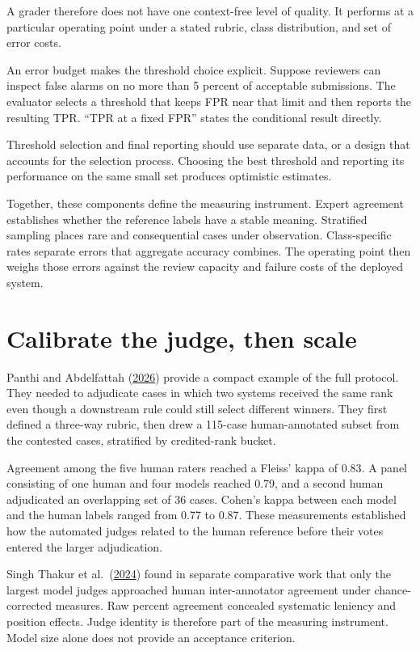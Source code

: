 A grader therefore does not have one context-free level of quality. It performs at a particular operating point under a stated rubric, class distribution, and set of error costs.

An error budget makes the threshold choice explicit. Suppose reviewers can inspect false alarms on no more than 5 percent of acceptable submissions. The evaluator selects a threshold that keeps FPR near that limit and then reports the resulting TPR. ``TPR at a fixed FPR'' states the conditional result directly.

Threshold selection and final reporting should use separate data, or a design that accounts for the selection process. Choosing the best threshold and reporting its performance on the same small set produces optimistic estimates.

Together, these components define the measuring instrument. Expert agreement establishes whether the reference labels have a stable meaning. Stratified sampling places rare and consequential cases under observation. Class-specific rates separate errors that aggregate accuracy combines. The operating point then weighs those errors against the review capacity and failure costs of the deployed system.

\section{Calibrate the judge, then scale}\label{calibrate-the-judge-then-scale}

Panthi and Abdelfattah (\href{https://arxiv.org/abs/2605.24060}{2026}) provide a compact example of the full protocol. They needed to adjudicate cases in which two systems received the same rank even though a downstream rule could still select different winners. They first defined a three-way rubric, then drew a 115-case human-annotated subset from the contested cases, stratified by credited-rank bucket.

Agreement among the five human raters reached a Fleiss' kappa of 0.83. A panel consisting of one human and four models reached 0.79, and a second human adjudicated an overlapping set of 36 cases. Cohen's kappa between each model and the human labels ranged from 0.77 to 0.87. These measurements established how the automated judges related to the human reference before their votes entered the larger adjudication.

Singh Thakur et al.~(\href{https://arxiv.org/abs/2406.12624}{2024}) found in separate comparative work that only the largest model judges approached human inter-annotator agreement under chance-corrected measures. Raw percent agreement concealed systematic leniency and position effects. Judge identity is therefore part of the measuring instrument. Model size alone does not provide an acceptance criterion.

